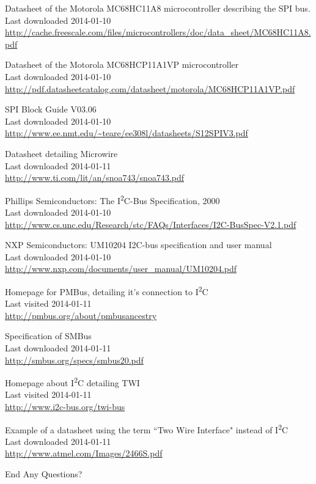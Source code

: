 \documentclass[]{beamer} %
\newcommand{\twi}{I\textsuperscript{2}C\xspace}
\begin{document}
\tiny
\begin{thebibliography}{9}
		Datasheet of the Motorola MC68HC11A8 microcontroller describing the SPI bus.\\
		Last downloaded 2014-01-10\\
		\url{http://cache.freescale.com/files/microcontrollers/doc/data_sheet/MC68HC11A8.pdf}

		Datasheet of the Motorola MC68HCP11A1VP microcontroller\\
		Last downloaded 2014-01-10\\
		\url{http://pdf.datasheetcatalog.com/datasheet/motorola/MC68HCP11A1VP.pdf}

		SPI Block Guide V03.06\\
		Last downloaded 2014-01-10\\
		\url{http://www.ee.nmt.edu/~teare/ee308l/datasheets/S12SPIV3.pdf}

		Datasheet detailing Microwire\\
		Last downloaded 2014-01-11\\
		\url{http://www.ti.com/lit/an/snoa743/snoa743.pdf}

		Phillips Semiconductors: The \twi-Bus Specification, 2000\\
		Last downloaded 2014-01-10\\
		\url{http://www.cs.unc.edu/Research/stc/FAQs/Interfaces/I2C-BusSpec-V2.1.pdf}

		NXP Semiconductors: UM10204 I2C-bus specification and user manual\\
		Last downloaded 2014-01-10\\
		\url{http://www.nxp.com/documents/user_manual/UM10204.pdf}

		Homepage for PMBus, detailing it's connection to \twi\\
		Last visited 2014-01-11\\
		\url{http://pmbus.org/about/pmbusancestry}

		Specification of SMBus\\
		Last downloaded 2014-01-11\\
		\url{http://smbus.org/specs/smbus20.pdf}

		Homepage about \twi detailing TWI\\
		Last visited 2014-01-11\\
		\url{http://www.i2c-bus.org/twi-bus}

		Example of a datasheet using the term ``Two Wire Interface" instead of \twi\\
		Last downloaded 2014-01-11\\
		\url{http://www.atmel.com/Images/2466S.pdf}


\end{thebibliography}


\begin{frame}
	{\Huge End}
	Any Questions?
\end{frame}
\end{document}
